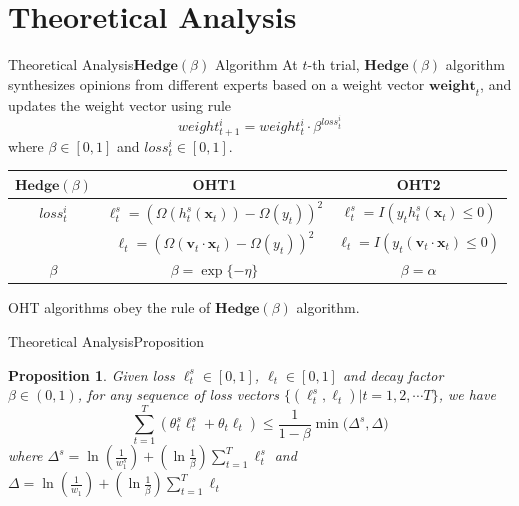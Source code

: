 \documentclass{beamer}
\newtheorem{prop}{Proposition}
\begin{document}
\section{Theoretical Analysis}
\begin{frame}{Theoretical Analysis}{$\mathbf{Hedge}(\beta)$ Algorithm}
At $t$-th trial, $\mathbf{Hedge}(\beta)$ algorithm synthesizes opinions from different experts based on a weight vector $\mathbf{weight}_t$, and updates the weight vector using rule
$$ weight_{t+1}^{i} = weight_{t}^{i} \cdot \beta^{loss_{t}^{i}} $$
where $\beta \in [0,1]$ and $loss_{t}^{i} \in [0,1]$.

\begin{tabular}{c|c|c}
\hline
\multicolumn{1}{c|}{$\mathbf{Hedge}(\beta)$} &
\multicolumn{1}{c|}{OHT1} &
\multicolumn{1}{c|}{OHT2} \\
\hline
$loss_{t}^{i}$ & $\ell_{t}^{s} = (\varOmega(h_{t}^{s}(\mathbf{x}_t)) - \varOmega(y_t)) ^ 2$ & $\ell_{t}^{s} = I(y_t h_{t}^{s}(\mathbf{x}_t) \leq 0)$ \\
               & $\ell_t = (\varOmega(\mathbf{v}_t \cdot \mathbf{x}_t) - \varOmega(y_t)) ^ 2$ & $\ell_{t} = I(y_t (\mathbf{v}_t \cdot \mathbf{x}_t) \leq 0)$ \\
\hline
$\beta$        & $\beta = \exp\{-\eta\}$ & $\beta = \alpha$ \\
\hline
\end{tabular}
OHT algorithms obey the rule of $\mathbf{Hedge}(\beta)$ algorithm.
\end{frame}

\begin{frame}{Theoretical Analysis}{Proposition}
\begin{prop}
Given loss $\ell_{t}^{s} \in [0,1]$, $\ell_t \in [0,1]$ and decay factor $\beta \in (0,1)$, for any sequence of loss vectors $\{ (\ell_{t}^{s}, \ell_{t}) | t = 1, 2, \cdots T \} $, we have
$$ \sum\limits_{t=1}^{T} ( \theta_{t}^{s} \ell_{t}^{s} + \theta_t \ell_t ) \leq \frac{1}{1-\beta} \min \big( \varDelta^s, \varDelta \big) $$
where
$ \varDelta^s = \ln(\frac{1}{w_{1}^{s}}) + (\ln \frac{1}{\beta}) \sum\limits_{t=1}^{T} \ell_{t}^{s} $ and $ \varDelta = \ln(\frac{1}{w_{1}}) + (\ln \frac{1}{\beta}) \sum\limits_{t=1}^{T} \ell_{t} $
\end{prop}
\end{frame}
\end{document}
